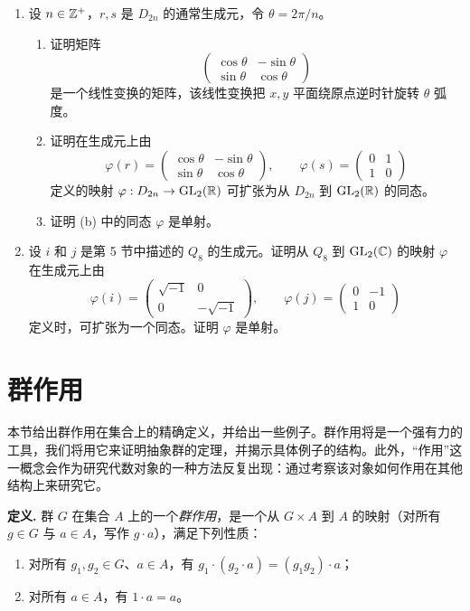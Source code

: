 \begin{enumerate}[label=\arabic*.]
  \item 设 $n\in\mathbb{Z}^+$，$r,s$ 是 $D_{2n}$ 的通常生成元，令 $\theta=2\pi/n$。
  \begin{enumerate}[label=(\alph*)]
    \item 证明矩阵
    \[
      \begin{pmatrix}\cos\theta&-\sin\theta\\ \sin\theta&\cos\theta\end{pmatrix}
    \]
    是一个线性变换的矩阵，该线性变换把 $x,y$ 平面绕原点逆时针旋转 $\theta$ 弧度。
    \item 证明在生成元上由
    \[
      \varphi(r)=\begin{pmatrix}\cos\theta&-\sin\theta\\ \sin\theta&\cos\theta\end{pmatrix},
      \qquad
      \varphi(s)=\begin{pmatrix}0&1\\1&0\end{pmatrix}
    \]
    定义的映射 $\varphi:D_{2n}\to\operatorname{GL}_2(\mathbb{R})$ 可扩张为从 $D_{2n}$ 到 $\operatorname{GL}_2(\mathbb{R})$ 的同态。
    \item 证明 (b) 中的同态 $\varphi$ 是单射。
  \end{enumerate}
  \item 设 $i$ 和 $j$ 是第 5 节中描述的 $Q_8$ 的生成元。证明从 $Q_8$ 到 $\operatorname{GL}_2(\mathbb{C})$ 的映射 $\varphi$ 在生成元上由
  \[
    \varphi(i)=\begin{pmatrix}\sqrt{-1}&0\\0&-\sqrt{-1}\end{pmatrix},
    \qquad
    \varphi(j)=\begin{pmatrix}0&-1\\1&0\end{pmatrix}
  \]
  定义时，可扩张为一个同态。证明 $\varphi$ 是单射。
\end{enumerate}


\section{群作用}

本节给出群作用在集合上的精确定义，并给出一些例子。群作用将是一个强有力的工具，我们将用它来证明抽象群的定理，并揭示具体例子的结构。此外，“作用”这一概念会作为研究代数对象的一种方法反复出现：通过考察该对象如何作用在其他结构上来研究它。

\noindent\textbf{定义.} 群 $G$ 在集合 $A$ 上的一个\emph{群作用}，是一个从 $G\times A$ 到 $A$ 的映射（对所有 $g\in G$ 与 $a\in A$，写作 $g\cdot a$），满足下列性质：
\begin{enumerate}[label=(\arabic*)]
  \item 对所有 $g_1,g_2\in G$、$a\in A$，有 $g_1\cdot(g_2\cdot a)=(g_1g_2)\cdot a$；
  \item 对所有 $a\in A$，有 $1\cdot a=a$。
\end{enumerate}

